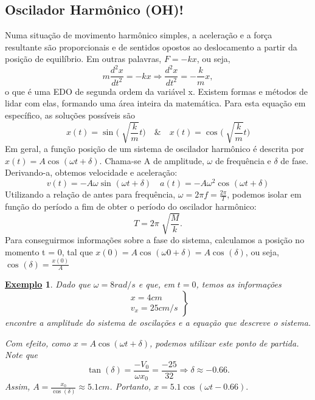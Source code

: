 \documentclass{article}
\newtheorem{example}{\underline{Exemplo}}
\begin{document}
\subsection{Oscilador Harmônico (OH)!}
Numa situação de movimento harmônico simples, a aceleração e a força resultante são
proporcionais e de sentidos opostos ao deslocamento a partir da posição de equilíbrio.
Em outras palavras, \(F = -kx\), ou seja, 
\[
  m\frac{d^{2}x}{dt^{2}}=-kx \Rightarrow \frac{d^{2}x}{dt^{2}}=-\frac{k}{m}x,
\]
o que é uma EDO de segunda ordem da variável x. Existem formas e métodos de lidar com elas,
formando uma área inteira da matemática. Para esta equação em específico, as soluções possíveis são 
\[
  x(t)=\sin^{}{\biggl(\sqrt[]{\frac{k}{m}}t\biggr)} \quad\&\quad x(t)=\cos^{}{\biggl(\sqrt[]{\frac{k}{m}}t\biggr)} 
\]
Em geral, a função posição de um sistema de oscilador harmônico é descrita por \(x(t) = A\cos^{}{(\omega t + \delta )}.\)
Chama-se A de amplitude, \(\omega \) de frequência e \(\delta \) de fase. Derivando-a, obtemos velocidade 
e aceleração: 
\[
  v(t) = -A\omega \sin^{}{(\omega t + \delta )}\quad a(t) = -A\omega^{2}\cos^{}{(\omega t + \delta )}
\]
Utilizando a relação de antes para frequência, \(\omega = 2\pi f = \frac{2\pi }{T}\), podemos
isolar em função do período a fim de obter o período do oscilador harmônico: 
\[
  T = 2\pi \sqrt[]{\frac{M}{k}}.
\]
Para conseguirmos informações sobre a fase do sistema, calculamos a posição no momento t = 0, tal que
\(x(0) = A\cos^{}{(\omega 0 + \delta )} = A\cos^{}{(\delta )}\), ou seja, \(\cos^{}{(\delta )}=\frac{x(0)}{A}\)
\begin{example}
  Dado que \(\omega = 8 rad/s\) e que, em \(t=0\), temos as informações 
  \[
    \left.\begin{array}{ll}
        x=4cm\\
        v_{x} = 25 cm/s
    \end{array}\right\}
  \] 
  encontre a amplitude do sistema de oscilações e a equação que descreve o sistema.

  Com efeito, como \(x = A \cos{(\omega t + \delta )}\), podemos utilizar este ponto de partida. Note que 
  \[
    \tan{(\delta )} = \frac{-V_{0}}{\omega x_{0}} = \frac{-25}{32} \Rightarrow \delta \approx -0.66.
  \]
  Assim, \(A = \frac{x_{0}}{\cos{(\delta )}}\approx 5.1cm\). Portanto, \(x = 5.1\cos{(\omega t - 0.66)}.\)
\end{example}
\end{document}
